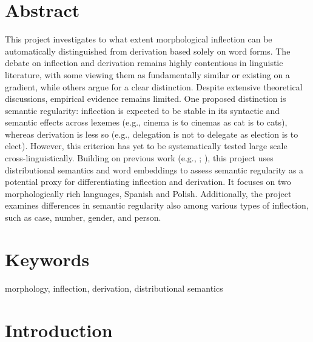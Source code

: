 \documentclass[12pt]{article}
\begin{document}
\section*{Abstract}
This project investigates to what extent morphological inflection can be automatically distinguished from derivation based solely on word forms. The debate on inflection and derivation remains highly contentious in linguistic literature, with some viewing them as fundamentally similar or existing on a gradient, while others argue for a clear distinction. Despite extensive theoretical discussions, empirical evidence remains limited. One proposed distinction is semantic regularity: inflection is expected to be stable in its syntactic and semantic effects across lexemes (e.g., cinema is to cinemas as cat is to cats), whereas derivation is less so (e.g., delegation is not to delegate as election is to elect). However, this criterion has yet to be systematically tested large scale cross-linguistically. 
Building on previous work (e.g., \textcite{bonami2018InflectionVsDerivation}; \textcite{rosa2019AttemptingSeparateInflection}), this project uses distributional semantics and word embeddings to assess semantic regularity as a potential proxy for differentiating inflection and derivation. It focuses on two morphologically rich languages, Spanish and Polish. Additionally, the project examines differences in semantic regularity also among various types of inflection, such as case, number, gender, and person.

\section*{Keywords}
morphology, inflection, derivation, distributional semantics

\newpage
\tableofcontents %
\newpage


\newpage
\section{Introduction}

\end{document}
